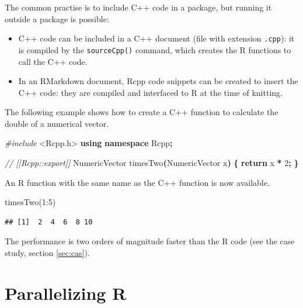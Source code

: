 \documentclass[
  12pt,
  american,
  a4paper,
  extrafontsizes,onecolumn,openright
  ]{memoir}
\newenvironment{Shaded}{\begin{snugshade}}{\end{snugshade}}
\newcommand{\CommentTok}[1]{\textcolor[rgb]{0.56,0.35,0.01}{\textit{#1}}}
\newcommand{\ControlFlowTok}[1]{\textcolor[rgb]{0.13,0.29,0.53}{\textbf{#1}}}
\newcommand{\DecValTok}[1]{\textcolor[rgb]{0.00,0.00,0.81}{#1}}
\newcommand{\FunctionTok}[1]{\textcolor[rgb]{0.00,0.00,0.00}{#1}}
\newcommand{\ImportTok}[1]{#1}
\newcommand{\KeywordTok}[1]{\textcolor[rgb]{0.13,0.29,0.53}{\textbf{#1}}}
\newcommand{\NormalTok}[1]{#1}
\newcommand{\OperatorTok}[1]{\textcolor[rgb]{0.81,0.36,0.00}{\textbf{#1}}}
\newcommand{\PreprocessorTok}[1]{\textcolor[rgb]{0.56,0.35,0.01}{\textit{#1}}}
\newcommand{\SpecialCharTok}[1]{\textcolor[rgb]{0.00,0.00,0.00}{#1}}
\providecommand{\tightlist}{%
  \setlength{\itemsep}{0pt}\setlength{\parskip}{0pt}}
\newlength{\rf}
\begin{document}
The common practise is to include C++ code in a package, but running it outside a package is possible:

\begin{itemize}
\tightlist
\item
  C++ code can be included in a C++ document (file with extension \texttt{.cpp}): it is compiled by the \texttt{sourceCpp()} command, which creates the R functions to call the C++ code.
\item
  In an RMarkdown document, Rcpp code snippets can be created to insert the C++ code: they are compiled and interfaced to R at the time of knitting.
\end{itemize}

The following example shows how to create a C++ function to calculate the double of a numerical vector.

\scriptsize

\begin{Shaded}
\begin{Highlighting}[]
\PreprocessorTok{\#include }\ImportTok{\textless{}Rcpp.h\textgreater{}}
\KeywordTok{using} \KeywordTok{namespace}\NormalTok{ Rcpp}\OperatorTok{;}

\CommentTok{// [[Rcpp::export]]}
\NormalTok{NumericVector timesTwo}\OperatorTok{(}\NormalTok{NumericVector x}\OperatorTok{)} \OperatorTok{\{}
  \ControlFlowTok{return}\NormalTok{ x }\OperatorTok{*} \DecValTok{2}\OperatorTok{;}
\OperatorTok{\}}
\end{Highlighting}
\end{Shaded}

\normalsize

An R function with the same name as the C++ function is now available.

\scriptsize

\begin{Shaded}
\begin{Highlighting}[]
\FunctionTok{timesTwo}\NormalTok{(}\DecValTok{1}\SpecialCharTok{:}\DecValTok{5}\NormalTok{)}
\end{Highlighting}
\end{Shaded}

\begin{verbatim}
## [1]  2  4  6  8 10
\end{verbatim}

\normalsize

The performance is two orders of magnitude faster than the R code (see the case study, section \ref{sec:cas}).

\hypertarget{parallelizing-r}{%
\section{Parallelizing R}\label{parallelizing-r}}
\end{document}
